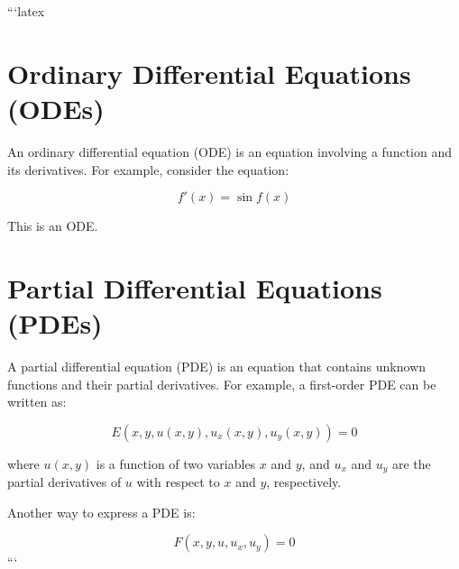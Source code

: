 ```latex
\section*{Ordinary Differential Equations (ODEs)}

An ordinary differential equation (ODE) is an equation involving a function and its derivatives. For example, consider the equation:

\begin{equation}
f'(x) = \sin f(x)
\end{equation}

This is an ODE.

\section*{Partial Differential Equations (PDEs)}

A partial differential equation (PDE) is an equation that contains unknown functions and their partial derivatives. For example, a first-order PDE can be written as:

\begin{equation}
E(x, y, u(x, y), u_x(x, y), u_y(x, y)) = 0
\end{equation}

where \( u(x, y) \) is a function of two variables \( x \) and \( y \), and \( u_x \) and \( u_y \) are the partial derivatives of \( u \) with respect to \( x \) and \( y \), respectively.

Another way to express a PDE is:

\begin{equation}
F(x, y, u, u_x, u_y) = 0
\end{equation}
```

